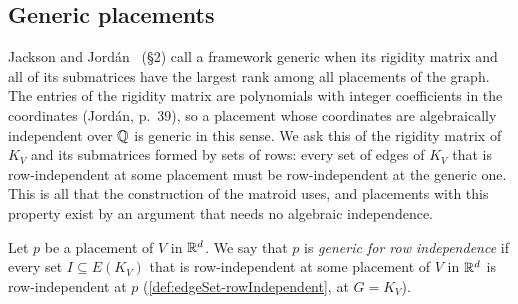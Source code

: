 \subsection{Generic placements}
\label{sec:bar-joint-3d-generic-placement}

Jackson and Jord\'an~\cite{jacksonJordan2008} (\S2) call a framework
generic when its rigidity matrix and all of its submatrices have the
largest rank among all placements of the graph. The entries of the
rigidity matrix are polynomials with integer coefficients in the
coordinates (Jord\'an, p.~39), so a placement whose coordinates are
algebraically independent over ${\mathbb{Q}}$ is generic in this sense. We ask
this of the rigidity matrix of $K_V$ and its submatrices formed by sets
of rows: every set of edges of $K_V$ that is row-independent at some
placement must be row-independent at the generic one. This is all that
the construction of the matroid uses, and placements with this
property exist by an argument that needs no algebraic independence.

\begin{definition}
  \label{def:generic-placement}
  \leanok
  Let $p$ be a placement of $V$ in ${\mathbb{R}}^{d}$. We say that $p$ is
  \emph{generic for row independence} if every set
  $I \subseteq E(K_V)$ that is row-independent at some placement of $V$
  in ${\mathbb{R}}^{d}$ is row-independent at $p$
  (\cref{def:edgeSet-rowIndependent}, at $G = K_V$).
\end{definition}

